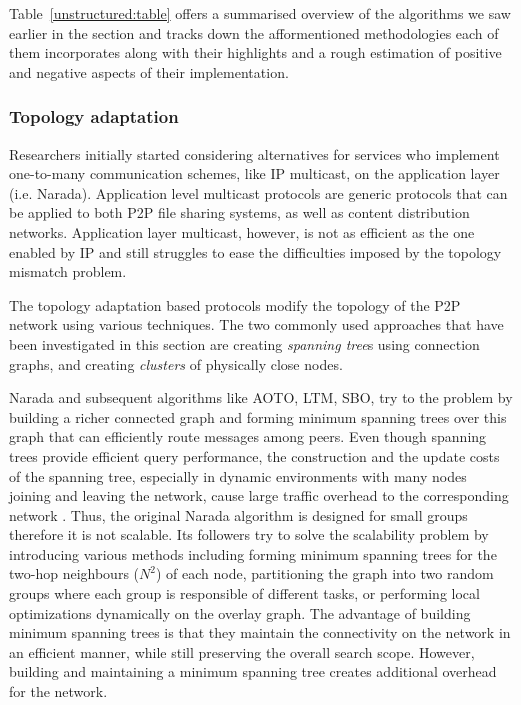 Table~\ref{unstructured:table} offers a summarised overview of the algorithms
we saw earlier in the section and tracks down the afformentioned methodologies
each of them incorporates along with their highlights and a rough estimation of
positive and negative aspects of their implementation.





\subsubsection{Topology adaptation}
Researchers initially started considering alternatives for services who
implement one-to-many communication schemes, like IP multicast, on the
application layer (i.e. Narada). Application level multicast protocols
are generic protocols that can be applied to both P2P file sharing systems, as
well as content distribution networks. Application layer multicast, however, is
not as efficient as the one enabled by IP and still struggles to ease the
difficulties imposed by the topology mismatch problem.

The topology adaptation based protocols modify the topology of the P2P network
using various techniques. The two commonly used approaches that have been
investigated in this section are creating \emph{spanning tree}s using connection
graphs, and creating \emph{clusters} of physically close nodes.

Narada and subsequent algorithms like AOTO, LTM, SBO, try to the problem by
building a richer connected graph and forming minimum spanning trees over this
graph that can efficiently route messages among peers. Even though spanning
trees provide efficient query performance, the construction and the update costs
of the spanning tree, especially in dynamic environments with many nodes joining
and leaving the network, cause large traffic overhead to the corresponding
network \cite{chu_esm_2000,chu_esm_2002}. Thus, the original Narada algorithm is
designed for small groups therefore it is not scalable. Its followers try to
solve the scalability problem by introducing various methods including forming
minimum spanning trees for the two-hop neighbours ($N^2$) of each node,
partitioning the graph into two random groups where each group is responsible of
different tasks, or performing local optimizations dynamically on the overlay
graph. The advantage of building minimum spanning trees is that they maintain
the connectivity on the network in an efficient manner, while still preserving
the overall search scope. However, building and maintaining a minimum spanning
tree creates additional overhead for the network.


